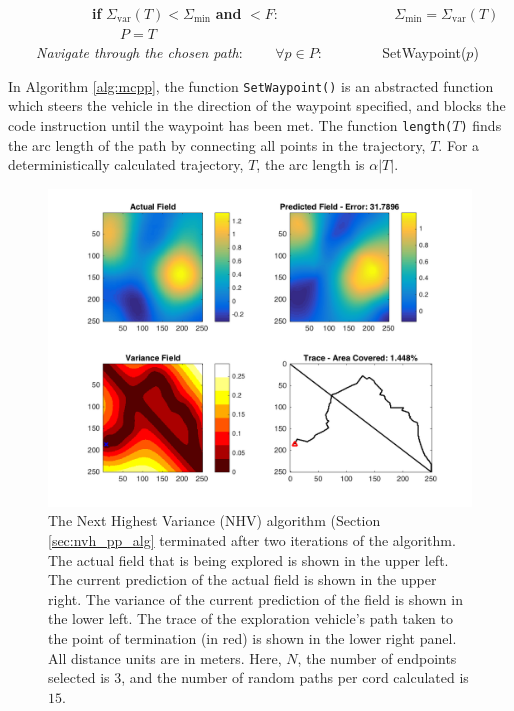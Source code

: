 \begin{algorithm}[h!]
\begin{algorithmic}[1]
	\State \ \ \ \  \ \ \ \  \ \ \ \ \textbf{if} $\Sigma_{\text{var}}(T) < \Sigma_{\text{min}}$ \textbf{and}  $< F$:
	\State \ \ \ \  \ \ \ \  \ \ \ \ \ \ \ \ $\Sigma_{\text{min}} = \Sigma_{\text{var}}(T)$
	\State \ \ \ \  \ \ \ \  \ \ \ \ \ \ \ \ $P = T$\\

	\BState \ \ \ \  \emph{Navigate through the chosen path}:
	\State \ \ \ \  $\forall p \in P$:
	\State \ \ \ \  \ \ \ \ SetWaypoint($p$) 
\EndProcedure
\end{algorithmic}
\end{algorithm}

In Algorithm \ref{alg:mcpp}, the function \texttt{SetWaypoint()} is an abstracted function which steers the vehicle in the direction of the waypoint specified, and blocks the code instruction until the waypoint has been met. The function \texttt{length(}$T$\texttt{)} finds the arc length of the path by connecting all points in the trajectory, $T$. For a deterministically calculated trajectory, $T$, the arc length is $\alpha |T|$.

\begin{figure}[hb!]
	\centering
	\includegraphics[width=0.95\linewidth]{figures/mc_4panel.png}
    \captionsetup{skip=0.20\baselineskip}
	\ssp
	\caption{The Next Highest Variance (NHV) algorithm (Section \ref{sec:nvh_pp_alg} terminated after two iterations of the algorithm. The actual field that is being explored is shown in the upper left. The current prediction of the actual field is shown in the upper right. The variance of the current prediction of the field is shown in the lower left. The trace of the exploration vehicle's path taken to the point of termination (in red) is shown in the lower right panel. All distance units are in meters. Here, $N$, the number of endpoints selected is $3$, and the number of random paths per cord calculated is $15$.}
	\label{fig:mcpp}
\end{figure}

